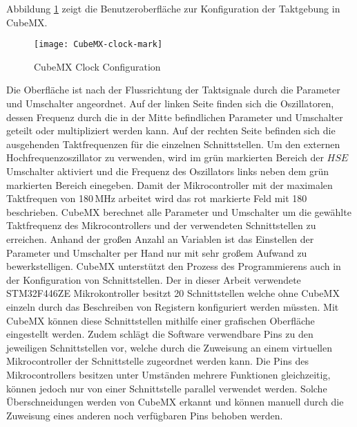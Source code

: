 Abbildung \ref{fig:CubeMXClock} zeigt die Benutzeroberfläche zur Konfiguration der Taktgebung in CubeMX. 
\begin{figure}[h]
	\centering
	\texttt{[image: CubeMX-clock-mark]}
	\caption{CubeMX Clock Configuration}
	\label{fig:CubeMXClock}
\end{figure}
Die Oberfläche ist nach der Flussrichtung der Taktsignale durch die Parameter und Umschalter angeordnet. Auf der linken Seite finden sich die Oszillatoren, dessen Frequenz durch die in der Mitte befindlichen Parameter und Umschalter geteilt oder multipliziert werden kann. Auf der rechten Seite befinden sich die ausgehenden Taktfrequenzen für die einzelnen Schnittstellen. Um den externen Hochfrequenzoszillator zu verwenden, wird im grün markierten Bereich der $HSE$ Umschalter aktiviert und die Frequenz des Oszillators links neben dem grün markierten Bereich einegeben. Damit der Mikrocontroller mit der maximalen Taktfrequen von 180\,MHz arbeitet wird das rot markierte Feld mit 180 beschrieben. CubeMX berechnet alle Parameter und Umschalter um die gewählte Taktfrequenz des Mikrocontrollers und der verwendeten Schnittstellen zu erreichen. Anhand der großen Anzahl an Variablen ist das Einstellen der Parameter und Umschalter per Hand nur mit sehr großem Aufwand zu bewerkstelligen. CubeMX unterstützt den Prozess des Programmierens auch in der Konfiguration von Schnittstellen. Der in dieser Arbeit verwendete STM32F446ZE Mikrokontroller besitzt 20 Schnittstellen welche ohne CubeMX einzeln durch das Beschreiben von Registern konfiguriert werden müssten. Mit CubeMX können diese Schnittstellen mithilfe einer grafischen Oberfläche eingestellt werden. Zudem schlägt die Software verwendbare Pins zu den jeweiligen Schnittstellen vor, welche durch die Zuweisung an einem virtuellen Mikrocontroller der Schnittstelle zugeordnet werden kann. Die Pins des Mikrocontrollers besitzen unter Umständen mehrere Funktionen gleichzeitig, können jedoch nur von einer Schnittstelle parallel verwendet werden.  Solche Überschneidungen werden von CubeMX erkannt und können manuell durch die Zuweisung eines anderen noch verfügbaren Pins behoben werden. 
